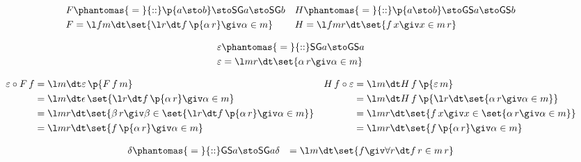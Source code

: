 \documentclass{article}
\newcommand{\SG}[1]{\textsf{SG}#1}
\newcommand{\GS}[1]{\textsf{GS}#1}
\newcommand{\type}{\phantomas{{}={}}{::}}
\begin{document}
\begin{align*}
F &\type \p{a\sto b} \sto \SG{a} \sto \SG{b}
&
H &\type \p{a\sto b} \sto \GS{a} \sto \GS{b}
%
\\
%
F &= \l fm\dt \set{\l r\dt f\,\p{\alpha\,r} \giv \alpha \in m}
&
H &= \l fmr\dt \set{f\,x \giv x\in m\,r}
\end{align*}

\begin{align*}
\varepsilon &\type \SG{a} \sto \GS{a}\\
\varepsilon &= \l mr\dt \set{\alpha\,r \giv \alpha\in m}
\end{align*}

\bigskip

\begin{center}
\end{center}

\bigskip

\begin{align*}
\varepsilon \circ F\,f
&=
\l m\dt \varepsilon\,\p{F\,f\,m}
&
H\,f \circ \varepsilon
&=
\l m\dt H\,f\,\p{\varepsilon\,m}
%
\\
%
&= \l m\dt \epsilon\,\set{\l r\dt f\,\p{\alpha\,r} \giv \alpha\in m}
&
&= \l m\dt H\,f\,\p{\l r\dt \set{\alpha\,r \giv \alpha\in m}}
%
\\
%
&= \l mr\dt \set{\beta\,r \giv \beta\in \set{\l r\dt f\,\p{\alpha\,r} \giv \alpha\in m}}
&
&= \l mr\dt \set{f\,x \giv x \in \set{\alpha\,r \giv \alpha\in m}}
%
\\
%
&= \l mr\dt \set{f\,\p{\alpha\,r} \giv \alpha\in m}
&
&= \l mr\dt \set{f\,\p{\alpha\,r} \giv \alpha\in m}
\end{align*}

\dotfill


\begin{align*}
\delta &\type \GS{a} \sto \SG{a}
\delta &= \l m\dt \set{f \giv \forall r\dt f\,r \in m\,r}
\end{align*}
\end{document}
